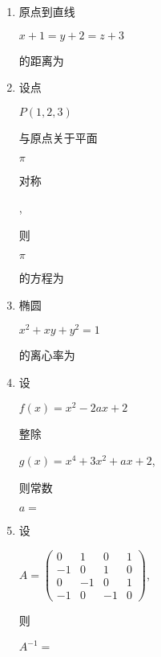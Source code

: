 \documentclass[10pt]{article}
\begin{document}
\begin{enumerate}
  \item \begin{CJK}{UTF8}{mj}原点到直线\end{CJK} $x+1=y+2=z+3$ \begin{CJK}{UTF8}{mj}的距离为\end{CJK}

  \item \begin{CJK}{UTF8}{mj}设点\end{CJK} $P(1,2,3)$ \begin{CJK}{UTF8}{mj}与原点关于平面\end{CJK} $\pi$ \begin{CJK}{UTF8}{mj}对称\end{CJK}, \begin{CJK}{UTF8}{mj}则\end{CJK} $\pi$ \begin{CJK}{UTF8}{mj}的方程为\end{CJK}

  \item \begin{CJK}{UTF8}{mj}椭圆\end{CJK} $x^{2}+x y+y^{2}=1$ \begin{CJK}{UTF8}{mj}的离心率为\end{CJK}

  \item \begin{CJK}{UTF8}{mj}设\end{CJK} $f(x)=x^{2}-2 a x+2$ \begin{CJK}{UTF8}{mj}整除\end{CJK} $g(x)=x^{4}+3 x^{2}+a x+2$, \begin{CJK}{UTF8}{mj}则常数\end{CJK} $a=$

  \item \begin{CJK}{UTF8}{mj}设\end{CJK} $A=\left(\begin{array}{cccc}0 & 1 & 0 & 1 \\ -1 & 0 & 1 & 0 \\ 0 & -1 & 0 & 1 \\ -1 & 0 & -1 & 0\end{array}\right)$, \begin{CJK}{UTF8}{mj}则\end{CJK} $A^{-1}=$


\end{enumerate}
\end{document}

